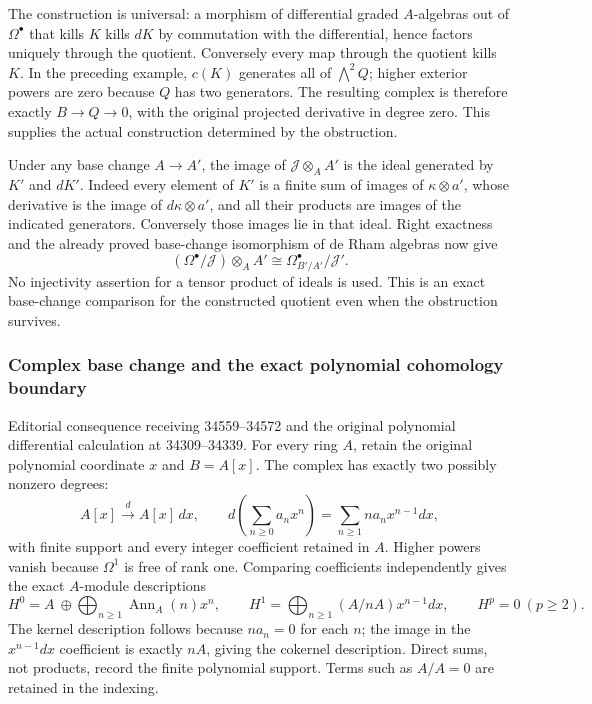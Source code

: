 The construction is universal: a morphism of differential graded \(A\)-algebras out of \(\Omega^\bullet\) that kills \(K\) kills \(dK\) by commutation with the differential, hence factors uniquely through the quotient. Conversely every map through the quotient kills \(K\). In the preceding example, \(c(K)\) generates all of \(\bigwedge^2Q\); higher exterior powers are zero because \(Q\) has two generators. The resulting complex is therefore exactly \(B\to Q\to0\), with the original projected derivative in degree zero. This supplies the actual construction determined by the obstruction.

Under any base change \(A\to A'\), the image of \(\mathcal J\otimes_A A'\) is the ideal generated by \(K'\) and \(dK'\). Indeed every element of \(K'\) is a finite sum of images of \(\kappa\otimes a'\), whose derivative is the image of \(d\kappa\otimes a'\), and all their products are images of the indicated generators. Conversely those images lie in that ideal. Right exactness and the already proved base-change isomorphism of de Rham algebras now give \[
(\Omega^\bullet/\mathcal J)\otimes_A A'
\cong \Omega_{B'/A'}^\bullet/\mathcal J'.
\] No injectivity assertion for a tensor product of ideals is used. This is an exact base-change comparison for the constructed quotient even when the obstruction survives.

\subsubsection{Complex base change and the exact polynomial cohomology boundary}\label{algebra-proof-042-complex-base-change-and-the-exact-polynomial-cohomology-boundary}

Editorial consequence receiving 34559--34572 and the original polynomial differential calculation at 34309--34339. For every ring \(A\), retain the original polynomial coordinate \(x\) and \(B=A[x]\). The complex has exactly two possibly nonzero degrees: \[
A[x]\xrightarrow d A[x]\,dx,
\qquad d\left(\sum_{n\ge0}a_nx^n\right)=\sum_{n\ge1}n a_n x^{n-1}dx,
\] with finite support and every integer coefficient retained in \(A\). Higher powers vanish because \(\Omega^1\) is free of rank one. Comparing coefficients independently gives the exact \(A\)-module descriptions \[
H^0=A\ \oplus\!\bigoplus_{n\ge1}\operatorname{Ann}_A(n)x^n,
\qquad
H^1=\bigoplus_{n\ge1}(A/nA)x^{n-1}dx,
\qquad H^p=0\ (p\ge2).
\] The kernel description follows because \(n a_n=0\) for each \(n\); the image in the \(x^{n-1}dx\) coefficient is exactly \(nA\), giving the cokernel description. Direct sums, not products, record the finite polynomial support. Terms such as \(A/A=0\) are retained in the indexing.


